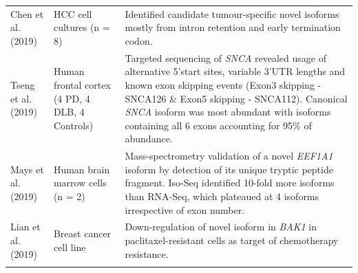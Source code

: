 \begin{landscape}
\begin{longtable}[c]{p{4cm}p{4cm}p{18cm}}
		\centering Chen et al. (2019) \cite{Chen2019} &
		\centering HCC cell cultures (n = 8)  &
		\tabitem Identified candidate tumour-specific novel isoforms mostly from intron retention and early termination codon.\\
		\hdashline[0.5pt/5pt]
		
		\centering Tseng et al. (2019) \cite{Tseng2019} &
		\centering Human frontal cortex \newline (4 PD, 4 DLB, 4 Controls)  &
		\tabitem Targeted sequencing of \textit{SNCA} revealed usage of alternative 5'start sites, variable 3'UTR lengths and known exon skipping events (Exon3 skipping - SNCA126 \& Exon5 skipping - SNCA112). \newline 
		\tabitem Canonical \textit{SNCA} isoform was most abundant with isoforms containing all 6 exons accounting for 95\% of abundance.\\
		\hdashline[0.5pt/5pt]
		
		\centering Mays et al. (2019)\cite{DeslattesMays2019} &
		\centering Human brain marrow cells (n = 2)  &
		\tabitem  Mass-spectrometry validation of a novel \textit{EEF1A1} isoform by detection of its unique tryptic peptide fragment. \newline 
		\tabitem Iso-Seq identified 10-fold more isoforms than RNA-Seq, which plateaued at 4 isoforms irrespective of exon number. \\
		\hdashline[0.5pt/5pt]
		
		\centering Lian et al. (2019) \cite{Lian2019} &
		\centering Breast cancer cell line &
		\tabitem Down-regulation of novel isoform in \textit{BAK1} in paclitaxel-resistant cells as target of chemotherapy resistance. \\
		\hdashline[0.5pt/5pt]
		

\end{longtable}
\end{landscape}
